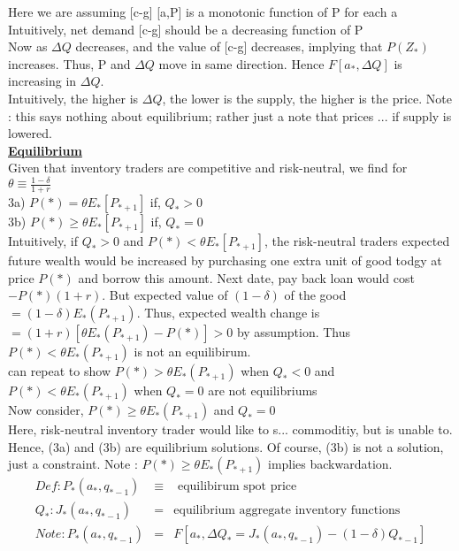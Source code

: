 Here we are assuming [c-g] [a,P] is a monotonic function of P for each a\\

Intuitively, net demand [c-g] should be a decreasing function of P\\

Now as $\Delta Q$ decreases, and the value of [c-g] decreases, implying that $P(Z_*)$ increases. Thus, P and $\Delta Q$ move in same direction. Hence $F[a_*, \Delta Q]$ is increasing in $\Delta Q$.\\

Intuitively, the higher is $\Delta Q$, the lower is the supply, the higher is the price. Note : this says nothing about equilibrium; rather just a note that prices ... if supply is lowered.\\

\textbf{\underline{Equilibrium}}\\
Given that inventory traders are competitive and risk-neutral, we find for $\theta \equiv \frac{1-\delta}{1+r}$\\

3a) $P(*) = \theta E_*[P_{*+1}] $ if, $Q_* > 0$\\
3b) $P(*) \geq \theta E_*[P_{*+1}] $ if, $Q_* = 0$\\

Intuitively, if $Q_* > 0$ and $P(*) < \theta E_* [P_{*+1}]$, the risk-neutral traders expected future wealth would be increased by purchasing one extra unit of good todgy at price $P(*)$ and borrow this amount. Next date, pay back loan would cost $-P(*) (1+r)$. But expected value of $(1-\delta)$ of the good $= (1-\delta) E_* (P_{*+1})$. Thus, expected wealth change is $= (1+r) [\theta E_*(P_{*+1}) - P(*)] > 0$ by assumption. Thus $P(*) < \theta E_*(P_{*+1})$ is not an equilibirum.\\

can repeat to show $P(*) > \theta E_*(P_{*+1})$ when $Q_* < 0$ and $P(*) < \theta E_*(P_{*+1})$ when $Q_* = 0$ are not equilibriums\\

Now consider, $P(*) \geq \theta E_*(P_{*+1})$ and $Q_* = 0$\\

Here, risk-neutral inventory trader would like to s... commoditiy, but is unable to. Hence, (3a) and (3b) are equilibrium solutions. Of course, (3b) is not a solution, just a constraint. Note : $P(*) \geq \theta E_*(P_{*+1})$ implies backwardation.\\
\begin{eqnarray*}
Def: P_*(a_*, q_{*-1}) &\equiv & \mbox{ equilibirum spot price}\\
Q_* : J_*(a_*, q_{*-1}) & = & \mbox{equilibrium aggregate inventory functions}\\
Note : P_*(a_*, q_{*-1}) &=& F[a_*, \Delta Q_* = J_*(a_*, q_{*-1}) - (1-\delta) Q_{*-1}]
\end{eqnarray*}

